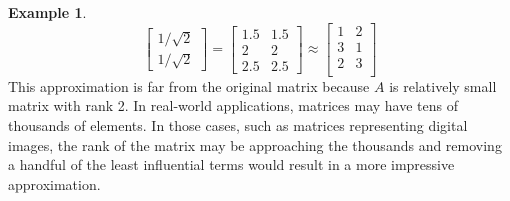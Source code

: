\documentclass[12pt, reqno]{amsart}
\theoremstyle{definition}
\newtheorem{example}[theorem]{Example}
\theoremstyle{remark}
\numberwithin{equation}{section}
\begin{document}
\begin{example}
\begin{equation}
\begin{bmatrix}
            1/\sqrt{2}\\
            1/\sqrt{2}
        \end{bmatrix}
        = \begin{bmatrix}
            1.5 & 1.5\\
            2 & 2\\
            2.5 & 2.5
        \end{bmatrix}
        \approx
        \begin{bmatrix}
            1 & 2\\
            3 & 1\\
            2 & 3\\
        \end{bmatrix}
    \end{equation}
This approximation is far from the original matrix because $A$ is relatively small matrix with rank 2. In real-world applications, matrices may have tens of thousands of elements. In those cases, such as matrices representing digital images, the rank of the matrix may be approaching the thousands and removing a handful of the least influential terms would result in a more impressive approximation.
\end{example}
\end{document}
